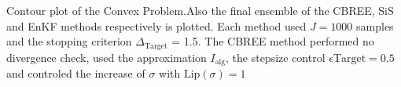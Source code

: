 Contour plot of the Convex Problem.Also the final ensemble of the CBREE, SiS and EnKF methods respectively is plotted. Each method used $J=1000$ samples and the stopping criterion $\Delta_{\text{Target}}$ = 1.5. The CBREE method performed no divergence check, used the approximation $I_\text{alg}$, the stepsize control $\epsilon{\text{Target}}=0.5$ and controled the increase of $\sigma$ with $\text{Lip}(\sigma) = 1$